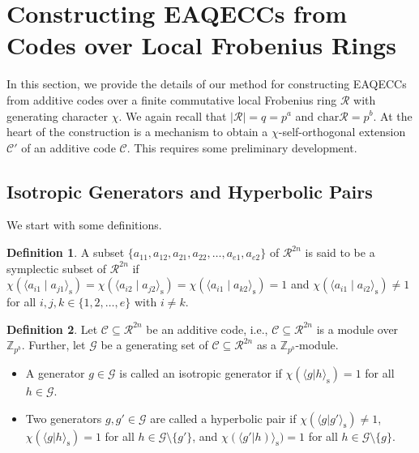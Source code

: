 \documentclass{article}
\theoremstyle{remark}
\theoremstyle{definition}
\newtheorem{defin}{Definition}[section]
\numberwithin{equation}{section}
\begin{document}
  \section{Constructing EAQECCs from Codes over Local Frobenius Rings}\label{sec3}
  
In this section, we provide the details of our method for constructing EAQECCs from additive codes over a finite commutative local Frobenius ring $\mathcal{R}$ with generating character $\chi$. We again recall that $|\mathcal{R}| = q = p^a$ and $\text{char}\mathcal{R} = p^b$. At the heart of the construction is a mechanism to obtain a $\chi$-self-orthogonal extension $\mathcal{C}'$ of an additive code $\mathcal{C}$. This requires some preliminary development.

\subsection{Isotropic Generators and Hyperbolic Pairs}
We start with some definitions.
\begin{defin} \label{def:sympl} A subset $\{a_{11},a_{12},a_{21},a_{22},\ldots,a_{e1},a_{e2}\}$
 of $\mathcal{R}^{2n}$ is said to be a symplectic subset of $\mathcal{R}^{2n}$ if
  $\chi(\langle a_{i1} \mid a_{j1} \rangle_{\text{s}}) = \chi(\langle a_{i2} \mid a_{j2} \rangle_{\text{s}}) = \chi(\langle a_{i1} \mid a_{k 2} \rangle_{\text{s}}) = 1$ and  $\chi(\langle a_{i1} \mid a_{i2} \rangle_{\text{s}})\neq1$ for all $i ,j, k \in \{1,2,\ldots,e\}$ with $i \neq k.$
 \end{defin}

\begin{defin} Let $\mathcal{C} \subseteq \mathcal{R}^{2n}$ be an additive code, i.e.,  $\mathcal{C} \subseteq \mathcal{R}^{2n}$ is a module over $\mathbb{Z}_{p^b}.$ Further, let $\mathcal{G}$ be a generating set of  $\mathcal{C} \subseteq \mathcal{R}^{2n}$ as a $\mathbb{Z}_{p^b}$-module.
\begin{itemize}
\item A generator $g \in \mathcal{G}$ is called an isotropic generator if  $\chi(\langle g | h \rangle_{\text{s}})=1$ for all $h \in \mathcal{G}.$
\item Two generators $g,g' \in \mathcal{G}$ are called a hyperbolic pair if $\chi(\langle g | g' \rangle_{\text{s}})\neq1$, $\chi(\langle g| h \rangle_{\text{s}})= 1$ for all $h \in \mathcal{G} \setminus \{g'\}$, and $\chi(\langle g'| h)\rangle_{\text{s}})=1$ for all $h \in \mathcal{G} \setminus \{g\}$.
\end{itemize}  
\end{defin}
 
\end{document}
